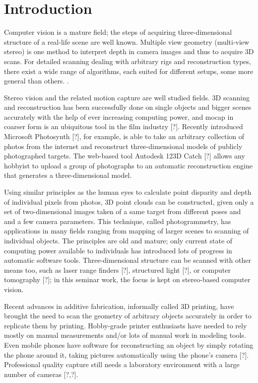\section{Introduction}
\thispagestyle{empty}

Computer vision is a mature field; the steps of acquiring three-dimensional structure of a real-life scene are well known.
Multiple view geometry (multi-view stereo) is one method to interpret depth in camera images and thus to acquire 3D scans.
\cite{hartley03multiview,szeliski10vision,trucco1998introductory,heyden2005multiple}
For detailed scanning dealing with arbitrary rigs and reconstruction types, there exist a wide range of algorithms, each suited for different setups, some more general than others.
\cite{seitz2006comparison}.

Stereo vision and the related motion capture are well studied fields.
3D scanning and reconstruction has been successfully done on single objects and bigger scenes accurately with the help of ever increasing computing power,
\cite{goesele2007multi,furukawa2010towards,pollefeys1999hand}
and mocap in coarser form is an ubiquitous tool in the film industry [?].
Recently introduced Microsoft Photosynth [?], for example, is able to take an arbitrary collection of photos from the internet and reconstruct three-dimensional models of publicly photographed targets.
The web-based tool Autodesk 123D Catch [?] allows any hobbyist to upload a group of photographs to an automatic reconstruction engine that generates a three-dimensional model.

Using similar principles as the human eyes to calculate point disparity and depth of individual pixels from photos, 3D point clouds can be constructed, given only a set of two-dimensional images taken of a same target from different poses and and a few camera parameters.
\cite{hartley03multiview}
This technique, called photogrammetry, has applications in many fields ranging from mapping of larger scenes to scanning of individual objects.
The principles are old and mature; only current state of computing power available to individuals has introduced lots of progress in automatic software tools.
Three-dimensional structure can be scanned with other means too, such as laser range finders [?], structured light [?], or computer tomography [?]; in this seminar work, the focus is kept on stereo-based computer vision.

Recent advances in additive fabrication, informally called 3D printing, have brought the need to scan the geometry of arbitrary objects accurately in order to replicate them by printing.
Hobby-grade printer enthusiasts have needed to rely mostly on manual measurements and/or lots of manual work in modeling tools.
Even mobile phones have software for reconstructing an object by simply rotating the phone around it, taking pictures automatically using the phone's camera [?]. Professional quality capture still needs a laboratory environment with a large number of cameras [?,?].

